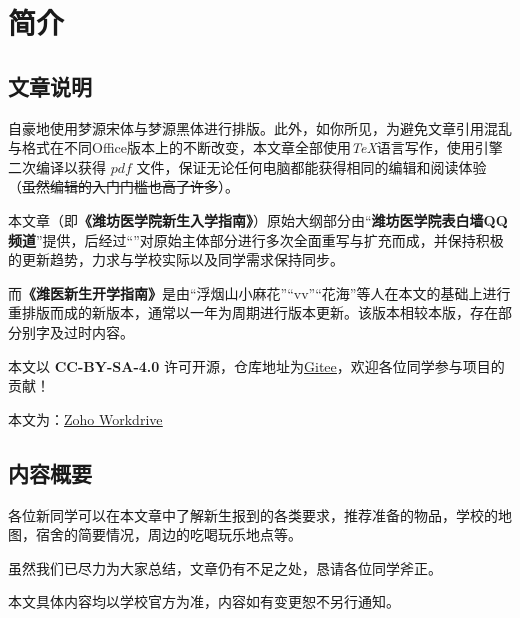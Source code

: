 \chapter[简介]{简介}
\section[文章说明]{文章说明}

自豪地使用梦源宋体与梦源黑体进行排版。此外，如你所见，为避免文章引用混乱与格式在不同Office版本上的不断改变，本文章全部使用\textit{\TeX}语言写作，使用\textit{\XeLaTeX}引擎二次编译以获得 $pdf$ 文件，保证无论任何电脑都能获得相同的编辑和阅读体验（\sout{虽然编辑的入门门槛也高了许多}）。

本文章（即\textbf{《潍坊医学院新生入学指南》}）原始大纲部分由“\textbf{潍坊医学院表白墙QQ频道}”提供，后经过“\textbf{}”对原始主体部分进行多次全面重写与扩充而成，并保持积极的更新趋势，力求与学校实际以及同学需求保持同步。

而\textbf{《潍医新生开学指南》}是由“浮烟山小麻花”“vv”“花海”等人在本文的基础上进行重排版而成的新版本，通常以一年为周期进行版本更新。该版本相较本版，存在部分别字及过时内容。

\bigbreak
\textbf{}

本文以 \textbf{CC-BY-SA-4.0} 许可开源，仓库地址为\uline{\href{https://gitee.com/mikazo/guide_for_freshman}{Gitee}}，欢迎各位同学参与项目的贡献！

本文\textbf{}为：\uline{\href{https://workdrive.zohoexternal.com/folder/sx5ijbbd2ad4d669c4c358d59fe314410aaf4}{Zoho Workdrive}}

\section[内容概要]{内容概要}

各位新同学可以在本文章中了解新生报到的各类要求，推荐准备的物品，学校的地图，宿舍的简要情况，周边的吃喝玩乐地点等。

虽然我们已尽力为大家总结，文章仍有不足之处，恳请各位同学斧正。

本文具体内容均以学校官方为准，内容如有变更恕不另行通知。